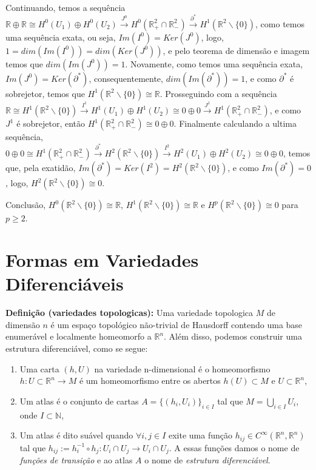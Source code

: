 \documentclass{article}
\begin{document}
	Continuando, temos a sequência $\mathbb{R} \oplus \mathbb{R} \cong H^{0}(U_{1}) \oplus H^{0}(U_{2}) \xrightarrow{J^{0}} H^{0}(\mathbb{R}^{2}_{+} \cap \mathbb{R}^{2}_{-}) \xrightarrow{\partial^{*}} H^{1}(\mathbb{R}^{2} \backslash \{0\})$, como temos uma sequência exata, ou seja, $Im(I^{0}) = Ker(J^{0})$, logo, $1 = dim(Im(I^{0})) = dim(Ker(J^{0}))$, e pelo teorema de dimensão e imagem temos que $dim(Im(J^{0})) = 1$. Novamente, como temos uma sequência exata, $Im(J^{0}) = Ker(\partial^{*})$, consequentemente, $dim(Im(\partial^{*})) = 1$, e como $\partial^{*}$ é sobrejetor, temos que $ H^{1}(\mathbb{R}^{2} \backslash \{0\}) \cong \mathbb{R}$. Prosseguindo com a sequência $\mathbb{R} \cong H^{1}(\mathbb{R}^{2} \backslash \{0\} ) \xrightarrow{I^{1}} H^{1}(U_{1}) \oplus H^{1}(U_{2}) \cong 0 \oplus 0 \xrightarrow{J^{1}} H^{1}(\mathbb{R}^{2}_{+} \cap \mathbb{R}^{2}_{-})$, e como $J^{1}$ é sobrejetor, então $H^{1}(\mathbb{R}^{2}_{+} \cap \mathbb{R}^{2}_{-}) \cong 0 \oplus 0$. Finalmente calculando a ultima sequência, $0 \oplus 0 \cong H^{1}(\mathbb{R}^{2}_{+} \cap \mathbb{R}^{2}_{-}) \xrightarrow{\partial^{*}} H^{2}(\mathbb{R}^{2} \backslash \{0\} ) \xrightarrow{I^{2}} H^{2}(U_{1}) \oplus H^{2}(U_{2}) \cong 0 \oplus 0$, temos que, pela exatidão, $Im(\partial^{*}) = Ker(I^{2}) = H^{2}(\mathbb{R}^{2} \backslash \{0\} )$, e como $Im(\partial^{*}) = 0$, logo, $H^{2}(\mathbb{R}^{2} \backslash \{0\} ) \cong 0$.
	
	Conclusão, $H^{0}(\mathbb{R}^{2} \backslash \{0\}) \cong \mathbb{R}$, $H^{1}(\mathbb{R}^{2} \backslash \{0\}) \cong \mathbb{R}$ e  $H^{p}(\mathbb{R}^{2} \backslash \{0\}) \cong 0$ para $p \geq 2$.
	
	\section{Formas em Variedades Diferenciáveis}
	\textbf{Definição (variedades topologicas):} Uma variedade topologica $M$ de dimensão $n$ é um espaço topológico não-trivial de Hausdorff contendo uma base enumerável e localmente homeomorfo a $\mathbb{R}^{n}$. Além disso, podemos construir uma estrutura diferenciável, como se segue:
	
	\begin{enumerate}
		\item Uma carta $(h, U)$ na variedade n-dimensional é o homeomorfismo $h: U \subset \mathbb{R}^{n} \to M$ é um homeomorfismo entre os abertos $h(U) \subset M$ e $U \subset \mathbb{R}^{n}$,
		
		\item Um atlas é o conjunto de cartas $A=\{(h_{i}, U_{i})\}_{i \in I}$ tal que $M = \bigcup_{i \in I} U_{i}$, onde $I \subset \mathbb{N}$,
		
		\item Um atlas é dito suável quando $\forall i, j \in I$ exite uma função $h_{ij} \in C^{\infty}(\mathbb{R}^{n}, \mathbb{R}^{n})$ tal que $h_{ij} := h_{i}^{-1} \circ h_{j} : U_{i} \cap U_{j} \to U_{i} \cap U_{j}$. A essas funções damos o nome de \textit{funções de transição} e ao  atlas $A$ o nome de \textit{estrutura diferenciável}.
	\end{enumerate}
	
\end{document}
